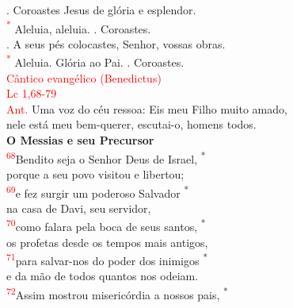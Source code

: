 \documentclass{book}
\begin{document}
\begin{center}
    {\color{red} \Rbar.} Coroastes Jesus de glória e esplendor. \\
    \textcolor{red}{\textsuperscript{*}} Aleluia, aleluia. {\color{red} \Rbar.} Coroastes. \\
    {\color{red} \Vbar.} A seus pés colocastes, Senhor, vossas obras. \\
    \textcolor{red}{\textsuperscript{*}} Aleluia. Glória ao Pai. {\color{red} \Rbar.} Coroastes.
    \vspace{.2cm} \\
    \textcolor{red}{Cântico evangélico (Benedictus) \\ Lc 1,68-79}
    \vspace{.2cm} \\
    \textcolor{red}{Ant.} Uma voz do céu ressoa: Eis meu Filho muito amado, \\
    nele está meu bem-querer, escutai-o, homens todos.
    \vspace{.2cm} \\
    \textbf{O Messias e seu Precursor}
    \vspace{.2cm} \\
    \textsuperscript{\underline{\hspace{.06in}}\textcolor{red}{68}}Bendito seja o Senhor Deus de Israel, \textsuperscript{*} \\
    porque a seu povo visitou e libertou;
    \vspace{.2cm} \\
    \textsuperscript{\underline{\hspace{.06in}}\textcolor{red}{69}}e fez surgir um poderoso Salvador \textsuperscript{*} \\
    na casa de Davi, seu servidor,
    \vspace{.2cm} \\
    \textsuperscript{\underline{\hspace{.06in}}\textcolor{red}{70}}como falara pela boca de seus santos, \textsuperscript{*} \\
    os profetas desde os tempos mais antigos,
    \vspace{.2cm} \\
    \textsuperscript{\underline{\hspace{.06in}}\textcolor{red}{71}}para salvar-nos do poder dos inimigos \textsuperscript{*} \\
    e da mão de todos quantos nos odeiam.
    \vspace{.2cm} \\
    \textsuperscript{\underline{\hspace{.06in}}\textcolor{red}{72}}Assim mostrou misericórdia a nossos pais, \textsuperscript{*} \\

\end{center}
\end{document}
